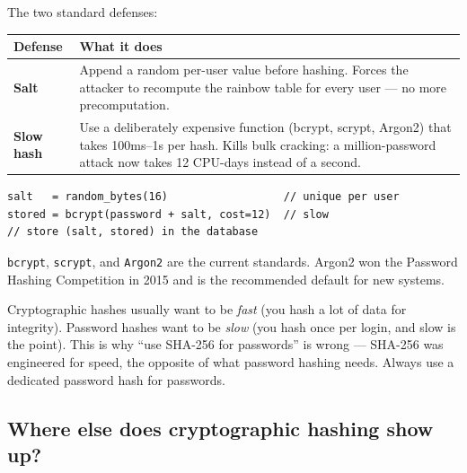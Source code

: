 \documentclass[11pt]{article}
\begin{document}
The two standard defenses:

\begin{center}
\begin{tabular}{|l|p{9cm}|}
\hline
\textbf{Defense} & \textbf{What it does} \\
\hline
\textbf{Salt} & Append a random per-user value before hashing. Forces the attacker to recompute the rainbow table for every user --- no more precomputation. \\
\textbf{Slow hash} & Use a deliberately expensive function (bcrypt, scrypt, Argon2) that takes 100ms--1s per hash. Kills bulk cracking: a million-password attack now takes 12 CPU-days instead of a second. \\
\hline
\end{tabular}
\end{center}

\begin{examplebox}
\begin{lstlisting}[basicstyle=\ttfamily\small,frame=single]
salt   = random_bytes(16)                  // unique per user
stored = bcrypt(password + salt, cost=12)  // slow
// store (salt, stored) in the database
\end{lstlisting}
\end{examplebox}

\texttt{bcrypt}, \texttt{scrypt}, and \texttt{Argon2} are the
current standards. Argon2 won the Password Hashing Competition
in 2015 and is the recommended default for new systems.

\begin{ideabox}
Cryptographic hashes usually want to be \emph{fast} (you hash a
lot of data for integrity). Password hashes want to be
\emph{slow} (you hash once per login, and slow is the point).
This is why ``use SHA-256 for passwords'' is wrong --- SHA-256
was engineered for speed, the opposite of what password hashing
needs. Always use a dedicated password hash for passwords.
\end{ideabox}

\subsection*{Where else does cryptographic hashing show up?}
\end{document}
